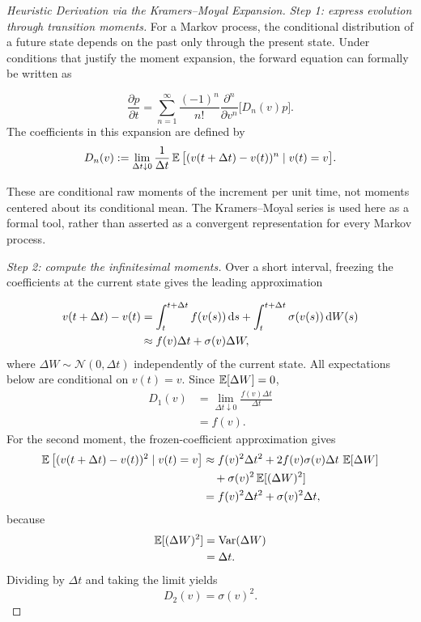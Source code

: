 \begin{proof}[Heuristic Derivation via the Kramers--Moyal Expansion]
\leavevmode\par\nobreak
\textit{Step 1: express evolution through transition moments.} For a Markov process, the conditional distribution of a future state depends on the past only through the present state. Under conditions that justify the moment expansion, the forward equation can formally be written as

\begin{equation}
\frac{\partial p}{\partial t}
=\sum_{n=1}^{\infty}\frac{(-1)^n}{n!}
\frac{\partial^n}{\partial v^n}\big[D_n(v)p\big].
\end{equation}
The coefficients in this expansion are defined by
\begin{equation}
D_n(v):=\lim_{\Delta t\downarrow0}\frac{1}{\Delta t}
\operatorname{\mathbb{E}}\big[(v(t+\Delta t)-v(t))^n\mid v(t)=v\big].
\end{equation}

These are conditional raw moments of the increment per unit time, not moments centered about its conditional mean. The Kramers--Moyal series is used here as a formal tool, rather than asserted as a convergent representation for every Markov process.

\textit{Step 2: compute the infinitesimal moments.} Over a short interval, freezing the coefficients at the current state gives the leading approximation

\begin{align}
v(t+\Delta t)-v(t)
&=\int_t^{t+\Delta t}f(v(s))\,\mathrm{d} s
+\int_t^{t+\Delta t}\sigma(v(s))\,\mathrm{d} W(s)\notag\\
&\approx f(v)\Delta t+\sigma(v)\Delta W,
\end{align}
where $\Delta W\sim\mathcal{N}(0,\Delta t)$ independently of the current state. All expectations below are conditional on $v(t)=v$. Since $\operatorname{\mathbb{E}}[\Delta W]=0$,
\begin{equation}
\begin{aligned}
D_1(v) &= \lim_{\Delta t\downarrow0}\frac{f(v)\Delta t}{\Delta t} \\
&= f(v).
\end{aligned}
\end{equation}
For the second moment, the frozen-coefficient approximation gives
\begin{align}
\operatorname{\mathbb{E}}\big[(v(t+\Delta t)-v(t))^2\mid v(t)=v\big]
&\approx f(v)^2\Delta t^2
+2f(v)\sigma(v)\Delta t\,\operatorname{\mathbb{E}}[\Delta W]\notag\\
&\quad+\sigma(v)^2\operatorname{\mathbb{E}}[(\Delta W)^2]\notag\\
&=f(v)^2\Delta t^2+\sigma(v)^2\Delta t,
\end{align}
because
\[
\begin{aligned}
\operatorname{\mathbb{E}}[(\Delta W)^2] &= \operatorname{Var}(\Delta W) \\
&= \Delta t.
\end{aligned}
\]
Dividing by $\Delta t$ and taking the limit yields
\begin{equation}
D_2(v)=\sigma(v)^2.
\end{equation}


\end{proof}
